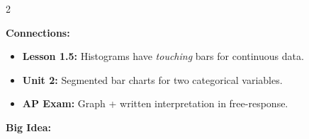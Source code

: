 \documentclass[10pt]{article}
\begin{document}
\begin{spiralbox}
\small
\begin{multicols}{2}

\textbf{Connections:}
\begin{itemize}[itemsep=2pt]
  \item \textbf{Lesson 1.5:} Histograms have \textit{touching} bars for continuous data.
  \item \textbf{Unit 2:} Segmented bar charts for two categorical variables.
  \item \textbf{AP Exam:} Graph + written interpretation in free-response.
\end{itemize}

\columnbreak

\textbf{Big Idea:}\\[4pt]

\end{multicols}
\end{spiralbox}
\end{document}
